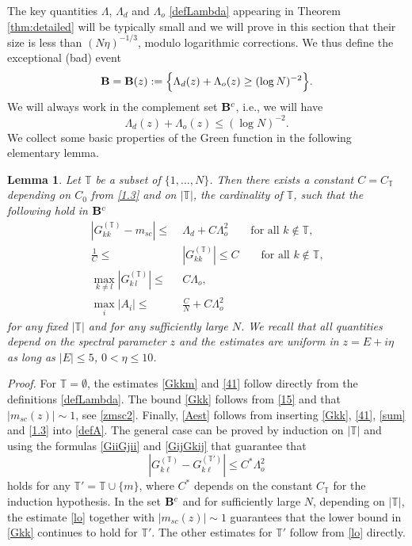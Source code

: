 \documentclass[draft]{article}
\newcommand{\bT}{{\T}}
\newcommand{\be}{\begin{equation}}
\newcommand{\ee}{\end{equation}}
\newcommand{\T}{\mathbb T}
\newtheorem{lemma}[theorem]{Lemma}
\newcommand{\qed}{\hfill\fbox{}\par\vspace{0.3mm}}
\numberwithin{equation}{section}
\numberwithin{theorem}{section}
\numberwithin{definition}{section}
\numberwithin{remark}{section}
\begin{document}
The key  quantities $\Lambda$, $\Lambda_d$ and $\Lambda_o$ \eqref{defLambda}
 appearing in Theorem \ref{thm:detailed} 
will be typically small and  we will prove in this section that
 their size is less than $( N \eta)^{-1/3}$,
modulo logarithmic  corrections. We thus define the exceptional (bad) event
\be\label{B}
 {\bf B} ={\bf B}(z):= \Big\{ \Lambda_d(z) + \Lambda_o(z)
\ge   (\log N)^{-2} \Big\}.
\ee
We will always work in the complement set
${\bf B}^c$, i.e.,  we will have
\be\label{15}
   \Lambda_d(z) + \Lambda_o(z)
\le (\log N)^{-2}.
\ee
We collect some basic properties of the Green function in the  following elementary lemma.






\begin{lemma}\label{62}
Let $\T$ be a subset of  $\{1, \ldots, N \}$.
 Then there exists a
constant $C=C_\T$  depending 
on $C_0$ from \eqref{1.3} and on $|\T|$,  the cardinality of $\T$,
 such that the following hold in ${\bf B}^c$ 
\begin{align}
 |G_{kk}^{(\bT)}-m_{sc}|\le & \;  \Lambda_d +  C\Lambda_o^2
 \qquad \mbox{for all $k\not \in \bT $,}
\label{Gkkm} \\
  \frac{1}{ C }\le & \; |G_{kk}^{(\bT)}|\le C  \qquad \mbox{for all 
$k\not\in \bT$,}
\label{Gkk} \\
 \max_{k\ne l} |G_{k\,l}^{(\bT)}|\le &\; C\Lambda_o,  \qquad
\label{41} \\
  \max_i |A_i|\le &\; \frac{C}{N} + C\Lambda^2_o  
\label{Aest}
\end{align}
for any fixed $|\T|$ and
for any sufficiently large $N$. We recall that all quantities
depend on the spectral parameter $z$ and
the estimates are uniform in  $z=E+i\eta$
as long as $|E|\le 5$, $0<\eta\le 10$.
\end{lemma} 


{\it Proof.} For $\T=\emptyset$, the estimates \eqref{Gkkm} and \eqref{41}
follow directly from the definitions \eqref{defLambda}. The bound \eqref{Gkk}
follows from \eqref{15} and that $|m_{sc}(z)|\sim 1$, see \eqref{zmsc2}.
Finally, \eqref{Aest} follows from inserting \eqref{Gkk}, \eqref{41}, \eqref{sum}
and \eqref{1.3} into \eqref{defA}.
The general case can be proved by induction on $|\bT|$ and using the 
formulas \eqref{GiiGjii} and \eqref{GijGkij} that guarantee that
\be
    |G^{(\T)}_{k\ell} - G^{(\T')}_{k\ell}|\le C^* \Lambda_o^2
\label{lo}
\ee
holds for any $\T' = \T \cup \{m\}$, where $C^*$ depends on the
constant $C_\T$ for the induction hypothesis. In the set ${\bf B}^c$ and
for sufficiently large $N$,
depending on $|\T|$, the estimate \eqref{lo} together with 
$|m_{sc}(z)|\sim 1$ guarantees that the lower bound in \eqref{Gkk}
continues to hold for $\T'$. The other estimates for $\T'$ follow
from \eqref{lo} directly. \qed
\end{document}
